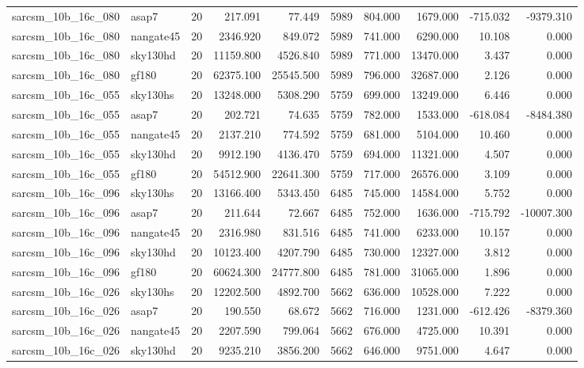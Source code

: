 \documentclass{article}
\begin{document}
\begin{longtable}{llrrrrrrrr}
sarcsm\_10b\_16c\_080 & asap7 & 20 & 217.091 & 77.449 & 5989 & 804.000 & 1679.000 & -715.032 & -9379.310 \\
sarcsm\_10b\_16c\_080 & nangate45 & 20 & 2346.920 & 849.072 & 5989 & 741.000 & 6290.000 & 10.108 & 0.000 \\
sarcsm\_10b\_16c\_080 & sky130hd & 20 & 11159.800 & 4526.840 & 5989 & 771.000 & 13470.000 & 3.437 & 0.000 \\
sarcsm\_10b\_16c\_080 & gf180 & 20 & 62375.100 & 25545.500 & 5989 & 796.000 & 32687.000 & 2.126 & 0.000 \\
sarcsm\_10b\_16c\_055 & sky130hs & 20 & 13248.000 & 5308.290 & 5759 & 699.000 & 13249.000 & 6.446 & 0.000 \\
sarcsm\_10b\_16c\_055 & asap7 & 20 & 202.721 & 74.635 & 5759 & 782.000 & 1533.000 & -618.084 & -8484.380 \\
sarcsm\_10b\_16c\_055 & nangate45 & 20 & 2137.210 & 774.592 & 5759 & 681.000 & 5104.000 & 10.460 & 0.000 \\
sarcsm\_10b\_16c\_055 & sky130hd & 20 & 9912.190 & 4136.470 & 5759 & 694.000 & 11321.000 & 4.507 & 0.000 \\
sarcsm\_10b\_16c\_055 & gf180 & 20 & 54512.900 & 22641.300 & 5759 & 717.000 & 26576.000 & 3.109 & 0.000 \\
sarcsm\_10b\_16c\_096 & sky130hs & 20 & 13166.400 & 5343.450 & 6485 & 745.000 & 14584.000 & 5.752 & 0.000 \\
sarcsm\_10b\_16c\_096 & asap7 & 20 & 211.644 & 72.667 & 6485 & 752.000 & 1636.000 & -715.792 & -10007.300 \\
sarcsm\_10b\_16c\_096 & nangate45 & 20 & 2316.980 & 831.516 & 6485 & 741.000 & 6233.000 & 10.157 & 0.000 \\
sarcsm\_10b\_16c\_096 & sky130hd & 20 & 10123.400 & 4207.790 & 6485 & 730.000 & 12327.000 & 3.812 & 0.000 \\
sarcsm\_10b\_16c\_096 & gf180 & 20 & 60624.300 & 24777.800 & 6485 & 781.000 & 31065.000 & 1.896 & 0.000 \\
sarcsm\_10b\_16c\_026 & sky130hs & 20 & 12202.500 & 4892.700 & 5662 & 636.000 & 10528.000 & 7.222 & 0.000 \\
sarcsm\_10b\_16c\_026 & asap7 & 20 & 190.550 & 68.672 & 5662 & 716.000 & 1231.000 & -612.426 & -8379.360 \\
sarcsm\_10b\_16c\_026 & nangate45 & 20 & 2207.590 & 799.064 & 5662 & 676.000 & 4725.000 & 10.391 & 0.000 \\
sarcsm\_10b\_16c\_026 & sky130hd & 20 & 9235.210 & 3856.200 & 5662 & 646.000 & 9751.000 & 4.647 & 0.000 \\

\end{longtable}
\end{document}
